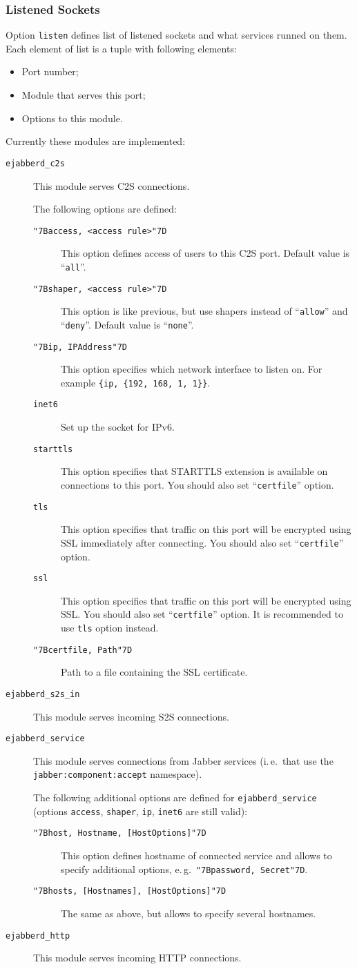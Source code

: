 \documentclass[a4paper,10pt]{article}
\newcommand{\bracehack}{\def\{{\char"7B}\def\}{\char"7D}}
\newcommand{\ns}[1]{\texttt{#1}}
\newcommand{\option}[1]{\texttt{#1}}
\newcommand{\poption}[1]{{\bracehack\texttt{#1}}}
\newcommand{\term}[1]{\texttt{#1}}
\newcommand{\Jabber}{Jabber}
\newcommand{\titem}[1]{\item[\bracehack\texttt{#1}]}
\begin{document}
\subsubsection{Listened Sockets}
\label{sec:configlistened}

Option \option{listen} defines list of listened sockets and what services
runned on them.  Each element of list is a tuple with following elements:
\begin{itemize}
\item Port number;
\item Module that serves this port;
\item Options to this module.
\end{itemize}

Currently these modules are implemented:
\begin{description}
  \titem{ejabberd\_c2s} This module serves C2S connections.
  
  The following options are defined:
  \begin{description}
    \titem{\{access, <access rule>\}} This option defines access of users
    to this C2S port.  Default value is ``\term{all}''.
    \titem{\{shaper, <access rule>\}} This option is like previous, but
    use shapers instead of ``\term{allow}'' and ``\term{deny}''.  Default
    value is ``\term{none}''.
    \titem{\{ip, IPAddress\}} This option specifies which network interface to
    listen on. For example \verb|{ip, {192, 168, 1, 1}}|.
    \titem{inet6} Set up the socket for IPv6.
    \titem{starttls} This option specifies that STARTTLS extension is available
    on connections to this port.  You should also set ``\verb|certfile|''
    option.
    \titem{tls} This option specifies that traffic on this port will be
    encrypted using SSL immediately after connecting.  You should also set
    ``\verb|certfile|'' option.
    \titem{ssl} This option specifies that traffic on this port will be
    encrypted using SSL.  You should also set ``\verb|certfile|'' option.  It
    is recommended to use \term{tls} option instead.
    \titem{\{certfile, Path\}} Path to a file containing the SSL certificate.
  \end{description}
  \titem{ejabberd\_s2s\_in} This module serves incoming S2S connections.
  \titem{ejabberd\_service} This module serves connections from \Jabber{}
  services (i.\,e.\ that use the \ns{jabber:component:accept} namespace).
  
  The following additional options are defined for \term{ejabberd\_service}
  (options \option{access}, \option{shaper}, \option{ip}, \option{inet6} are
  still valid):
  \begin{description}
    \titem{\{host, Hostname, [HostOptions]\}} This option defines hostname of connected
    service and allows to specify additional options, e.\,g.\
    \poption{\{password, Secret\}}.
    \titem{\{hosts, [Hostnames], [HostOptions]\}} The same as above, but allows to
    specify several hostnames.
  \end{description}
  \titem{ejabberd\_http} This module serves incoming HTTP connections.


\end{description}
\end{document}
